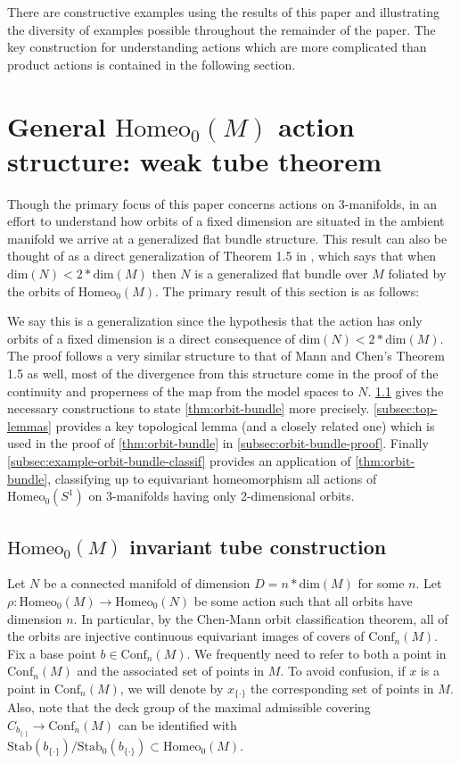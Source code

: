 \documentclass[10pt, oneside]{article}
\newcommand{\homeo}[1][S^1]{\text{Homeo}_0(#1)}
\newcommand{\conf}[2][S^1]{\text{Conf}_{#2}(#1)}
\newcommand{\set}{{\{\cdot\}}}
\newcommand{\stab}[1]{\text{Stab}(#1)}
\newcommand{\pstab}[1]{\text{Stab}_0(#1)}
\newcommand{\maxcov}{C_{b_\set}}
\newcommand{\dimn}[1]{\text{dim}(#1)}
\theoremstyle{definition}
\theoremstyle{definition}
\begin{document}
There are constructive examples using the results of this paper and illustrating the diversity of examples possible throughout the remainder of the paper. The key construction for understanding actions which are more complicated than product actions is contained in the following section.


\section{General \texorpdfstring{$\homeo[M]$}{Homeo\_0(M)} action structure: weak tube theorem}\label{sec:orbit-bundle-lemma}
Though the primary focus of this paper concerns actions on 3-manifolds, in an effort to understand how orbits of a fixed dimension are situated in the ambient manifold we arrive at a generalized flat bundle structure. This result can also be thought of as a direct generalization of Theorem 1.5 in \cite{chen:StructureTheorems}, which says that when $\dimn{N} < 2*\dimn{M}$ then $N$ is a generalized flat bundle over $M$ foliated by the orbits of $\homeo[M]$. The primary result of this section is as follows:
\orbitbundle*

We say this is a generalization since the hypothesis that the action has only orbits of a fixed dimension is a direct consequence of $\dimn{N} < 2*\dimn{M}$. The proof follows a very similar structure to that of Mann and Chen's Theorem 1.5 as well, most of the divergence from this structure come in the proof of the continuity and properness of the map from the model spaces to $N$. \cref{subsec:orbit-bundle-construction} gives the necessary constructions to state \ref{thm:orbit-bundle} more precisely. \cref{subsec:top-lemmas} provides a key topological lemma (and a closely related one) which is used in the proof of \cref{thm:orbit-bundle} in \cref{subsec:orbit-bundle-proof}. Finally \cref{subsec:example-orbit-bundle-classif} provides an application of \cref{thm:orbit-bundle}, classifying up to equivariant homeomorphism all actions of $\homeo$ on 3-manifolds having only 2-dimensional orbits.

\subsection{\texorpdfstring{$\homeo[M]$}{Homeo\_0(M)} invariant tube construction}\label{subsec:orbit-bundle-construction}
Let $N$ be a connected manifold of dimension $D=n*\text{dim}(M)$ for some $n$. Let $\rho:\homeo[M]\to\homeo[N]$ be some action such that all orbits have dimension $n$. In particular, by the Chen-Mann orbit classification theorem, all of the orbits are injective continuous equivariant images of covers of $\conf[M]{n}$.
Fix a base point $b\in \conf[M]{n}$.
We frequently need to refer to both a point in $\conf[M]{n}$
and the associated set of points in $M$.
To avoid confusion,
if $x$ is a point in $\conf[M]{n}$,
we will denote by $x_\set$ the corresponding set of points in $M$.
Also,
note that the deck group of the maximal admissible covering $\maxcov \to \conf[M]{n}$ can be identified with $\stab{b_\set}/\pstab{b_\set}\subset\homeo[M]$.
\end{document}
